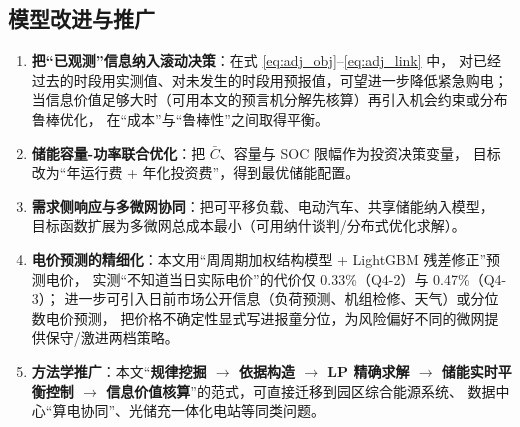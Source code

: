 \subsection{模型改进与推广}

\begin{enumerate}[label=(\arabic*), leftmargin=2.2em, itemsep=2pt]
\item \textbf{把“已观测\nobreak”信息纳入滚动决策}\nobreak：在式 \eqref{eq:adj_obj}--\eqref{eq:adj_link} 中\nobreak，
对已经过去的时段用实测值\nobreak、对未发生的时段用预报值\nobreak，可望进一步降低紧急购电\nobreak；
当信息价值足够大时（可用本文的预言机分解先核算\nobreak）再引入机会约束或分布鲁棒优化\nobreak，
在“成本\nobreak”与“鲁棒性\nobreak”之间取得平衡\nobreak。
\item \textbf{储能容量-功率联合优化}\nobreak：把 $\bar C$\nobreak、容量与 SOC 限幅作为投资决策变量\nobreak，
目标改为“年运行费 + 年化投资费\nobreak”\nobreak，得到最优储能配置\nobreak。
\item \textbf{需求侧响应与多微网协同}\nobreak：把可平移负载\nobreak、电动汽车\nobreak、共享储能纳入模型\nobreak，
目标函数扩展为多微网总成本最小（可用纳什谈判/分布式优化求解\nobreak）\nobreak。
\item \textbf{电价预测的精细化}\nobreak：本文用“周周期加权结构模型 + LightGBM 残差修正\nobreak”预测电价\nobreak，
实测“不知道当日实际电价\nobreak”的代价仅 0.33\%（Q4-2\nobreak）与 0.47\%（Q4-3\nobreak）\nobreak；
进一步可引入日前市场公开信息（负荷预测、机组检修、天气\nobreak）或分位数电价预测\nobreak，
把价格不确定性显式写进报童分位\nobreak，为风险偏好不同的微网提供保守/激进两档策略\nobreak。
\item \textbf{方法学推广}\nobreak：本文“\textbf{规律挖掘 $\to$ 依据构造 $\to$ LP 精确求解 $\to$
储能实时平衡控制 $\to$ 信息价值核算}\nobreak”的范式\nobreak，可直接迁移到园区综合能源系统\nobreak、
数据中心“算电协同\nobreak”\nobreak、光储充一体化电站等同类问题\nobreak。
\end{enumerate}
